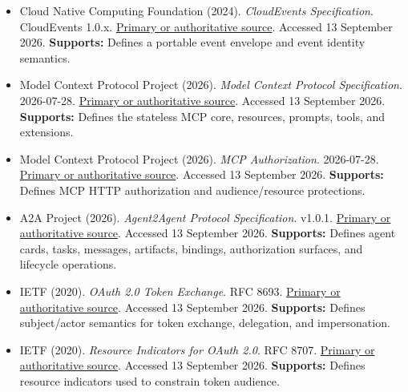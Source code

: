 \begin{itemize}

\item {}\textbf{} Cloud Native Computing Foundation (2024). \emph{CloudEvents Specification}. CloudEvents 1.0.x. \href{\detokenize{https://github.com/cloudevents/spec/blob/main/cloudevents/spec.md}}{Primary or authoritative source}. Accessed 13 September 2026. \textbf{Supports:} Defines a portable event envelope and event identity semantics.

\item {}\textbf{} Model Context Protocol Project (2026). \emph{Model Context Protocol Specification}. 2026-07-28. \href{\detokenize{https://modelcontextprotocol.io/specification/2026-07-28}}{Primary or authoritative source}. Accessed 13 September 2026. \textbf{Supports:} Defines the stateless MCP core, resources, prompts, tools, and extensions.

\item {}\textbf{} Model Context Protocol Project (2026). \emph{MCP Authorization}. 2026-07-28. \href{\detokenize{https://modelcontextprotocol.io/specification/2026-07-28/basic/authorization}}{Primary or authoritative source}. Accessed 13 September 2026. \textbf{Supports:} Defines MCP HTTP authorization and audience/resource protections.

\item {}\textbf{} A2A Project (2026). \emph{Agent2Agent Protocol Specification}. v1.0.1. \href{\detokenize{https://a2a-protocol.org/v1.0.1/specification}}{Primary or authoritative source}. Accessed 13 September 2026. \textbf{Supports:} Defines agent cards, tasks, messages, artifacts, bindings, authorization surfaces, and lifecycle operations.

\item {}\textbf{} IETF (2020). \emph{OAuth 2.0 Token Exchange}. RFC 8693. \href{\detokenize{https://datatracker.ietf.org/doc/html/rfc8693}}{Primary or authoritative source}. Accessed 13 September 2026. \textbf{Supports:} Defines subject/actor semantics for token exchange, delegation, and impersonation.

\item {}\textbf{} IETF (2020). \emph{Resource Indicators for OAuth 2.0}. RFC 8707. \href{\detokenize{https://datatracker.ietf.org/doc/html/rfc8707}}{Primary or authoritative source}. Accessed 13 September 2026. \textbf{Supports:} Defines resource indicators used to constrain token audience.


\end{itemize}
